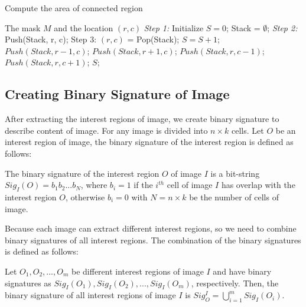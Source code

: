 \documentclass{amcs}
\begin{document}
\begin{algorithm}[!ht]
\caption{Compute the area of connected region}
\label{Region-alg}
\begin{algorithmic}[1]
\REQUIRE The mask $M$ and the location $(r,c)$
\STATE \textit{Step 1:} Initialize $S = 0$; Stack = $\emptyset$;
\STATE \textit{Step 2:} Push(Stack, r, c);
\STATE Step 3: 
				\STATE $(r,c)$ = Pop(Stack);
				\STATE $S = S + 1$;
					\STATE  $Push(Stack,r-1,c)$;
				\ENDIF
					\STATE $Push(Stack,r+1,c)$;
				\ENDIF
					\STATE $Push(Stack,r,c-1)$;
				\ENDIF
					\STATE $Push(Stack,r,c+1)$;            
				\ENDIF
			\ENDWHILE
\RETURN $S$;
\end{algorithmic}
\end{algorithm}

\subsection{Creating Binary Signature of Image}
After extracting the interest regions of image, we create binary signature to describe content of image. For any image is divided into $n \times k$ cells. Let $O$ be an interest region of image, the binary signature of the interest region is defined as follows:
\begin{definition}{} The binary signature of the interest region $O$ of image $I$ is a bit-string $Si{g_I}(O) = {b_1}{b_2}...{b_N}$, where ${b_i} = 1$ if the $i^{th}$ cell of image $I$ has overlap with the interest region $O$, otherwise ${b_i} = 0$ with $N = n \times k$ be the number of cells of image.
\label{Signature-def1}
\end{definition}

Because each image can extract different interest regions, so we need to combine binary signatures of all interest regions. The combination of the binary signatures is defined as follows:
\begin{definition}{} Let ${O_1},{O_2},...,{O_m}$ be different interest regions of image $I$ and have binary signatures as $Si{g_I}({O_1}),Si{g_I}({O_2}),...,Si{g_I}({O_m})$, respectively. Then, the binary signature of all interest regions of image $I$ is $Sig_O^I = \bigcup\limits_{i = 1}^m {Si{g_I}({O_i})} $.
\label{Signature-def2}
\end{definition}
\end{document}
